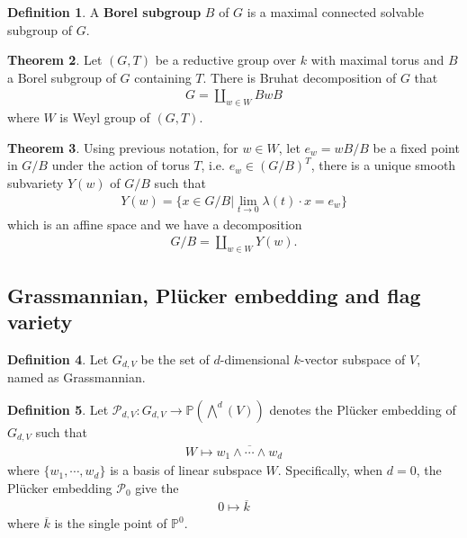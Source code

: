 \documentclass[10pt,UTF8]{article}
\theoremstyle{definition}
\newtheorem{definition}{Definition}[section]
\newtheorem{theorem}[definition]{Theorem}
\begin{document}
\begin{definition}
  A \textbf{Borel subgroup} $B$ of $G$ is a maximal connected solvable subgroup of $G$.
\end{definition}

\begin{theorem}
  Let $(G,T)$ be a reductive group over $k$ with maximal torus and $B$ a Borel subgroup of $G$ containing $T$. 
  There is Bruhat decomposition of $G$ that 
  \begin{align*}
     G = \coprod_{w\in W} BwB
  \end{align*} 
  where $W$ is Weyl group of $(G,T)$.
\end{theorem}
\begin{theorem}
  Using previous notation, for $w\in W$, let $e_w = wB/B$ be a fixed point in $G/B$ under the action of torus $T$, i.e. $e_w \in (G/B)^T$, there is a unique smooth subvariety $Y(w)$ of $G/B$ such that 
  \begin{align*}
    Y(w) = \{x\in G/B|\lim_{t\to 0}\lambda(t)\cdot x = e_w\}
  \end{align*}
  which is an affine space and we have a decomposition
  \begin{align*}
    G/B = \coprod_{w\in W} Y(w).
  \end{align*}
\end{theorem}



\subsection{Grassmannian, Plücker embedding and flag variety}
\begin{definition}
  Let ${G}_{d,V}$ be the set of $d$-dimensional $k$-vector subspace of $V$, named as Grassmannian.
\end{definition}


\begin{definition}
  Let $\mathcal{P}_{d,V}:G_{d,V} \to \mathbb{P}\left( \bigwedge^d(V)\right)$ denotes the Plücker embedding of $G_{d,V}$ such that
  \begin{align*}
    W \mapsto \overline{w_1\wedge\cdots \wedge w_d}
  \end{align*}
  where $\{w_1,\cdots,w_d\}$ is a basis of linear subspace $W$. Specifically, when $d=0$, the Plücker embedding $\mathcal{P}_0$ give the 
  \begin{align*}
    0 \mapsto \overline{k}
  \end{align*} 
  where $\overline{k}$ is the single point of $\mathbb{P}^0$.
\end{definition}
\end{document}
